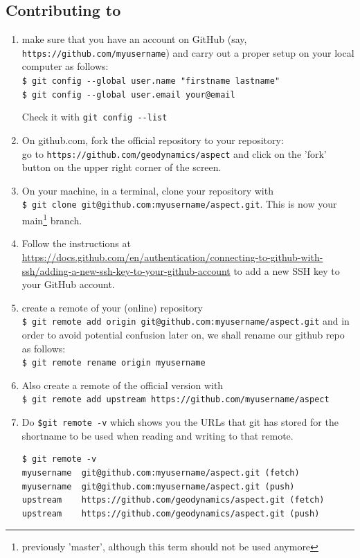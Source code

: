 
\subsection{Contributing to \aspect}

\begin{enumerate}
\item make sure that you  have an account on GitHub (say, \verb"https://github.com/myusername") 
and carry out a proper setup on your local computer as follows:\\
\verb'$ git config --global user.name "firstname lastname" '\\
\verb'$ git config --global user.email your@email'

Check it with \verb'git config --list'

\item On github.com, fork the official \aspect repository to your repository:\\
go to \verb"https://github.com/geodynamics/aspect"
and click on the 'fork' button on the upper right corner of the screen.

\item On your machine, in a terminal, clone your repository with \\
\verb"$ git clone git@github.com:myusername/aspect.git". 
This is now your main\footnote{previously 'master', although this term should not be used anymore} branch.

\item 
Follow the instructions at \url{https://docs.github.com/en/authentication/connecting-to-github-with-ssh/adding-a-new-ssh-key-to-your-github-account}
to add a new SSH key to your GitHub account.
 
\item create a remote of your (online) repository\\
\verb"$ git remote add origin git@github.com:myusername/aspect.git"
and in order to avoid potential confusion later on, we shall rename our github repo as follows:\\
\verb"$ git remote rename origin myusername" 

\item Also create a remote of the official version with\\
\verb"$ git remote add upstream https://github.com/myusername/aspect"

\item Do \verb"$git remote -v" which shows you the URLs that git 
has stored for the shortname to be used when reading and writing to that remote.
\begin{verbatim}
$ git remote -v
myusername	git@github.com:myusername/aspect.git (fetch)
myusername	git@github.com:myusername/aspect.git (push)
upstream	https://github.com/geodynamics/aspect.git (fetch)
upstream	https://github.com/geodynamics/aspect.git (push)
\end{verbatim}

\end{enumerate}

